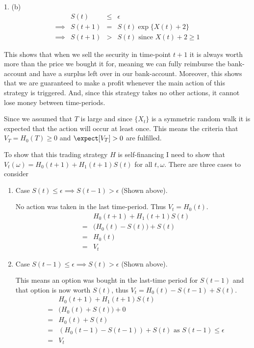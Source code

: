 \documentclass[11pt,a4paper]{article}
\begin{document}
\begin{answer}{1. (b)}
  \[\begin{array}{rrcl}
    &S(t)&\leq&\epsilon\\
    \implies&S(t+1)&=&S(t)\exp\{X(t)+2\}\\
    \implies&S(t+1)&>&S(t)\text{ since }X(t)+2\geq1
  \end{array}\]

  This shows that when we sell the security in time-point $t+1$ it is always worth more than the price we bought it for, meaning we can fully reimburse the bank-account and have a surplus left over in our bank-account. Moreover, this shows that we are guaranteed to make a profit whenever the main action of this strategy is triggered. And, since this strategy takes no other actions, it cannot lose money between time-periods.
  \par Since we assumed that $T$ is large and since $\{X_t\}$ is a symmetric random walk it is expected that the action will occur at least once. This means the criteria that $V_T=H_0(T)\geq0$ and $\expect[V_T]>0$ are fulfilled.

  \par To show that this trading strategy $H$ is self-financing I need to show that $V_t(\omega)=H_0(t+1)+H_1(t+1)S(t)$ for all $t,\omega$. There are three cases to consider
  \begin{enumerate}
    \item Case $S(t)\leq\epsilon\implies S(t-1)>\epsilon$ (Shown above).
    \par No action was taken in the last time-period. Thus $V_t=H_0(t)$.
    \[\begin{array}{rcl}
      &&H_0(t+1)+H_1(t+1)S(t)\\
      &=&\big(H_0(t)-S(t)\big)+S(t)\\
      &=&H_0(t)\\
      &=&V_t
    \end{array}\]

    \item Case $S(t-1)\leq\epsilon\implies S(t)>\epsilon$ (Shown above).
    \par This means an option was bought in the last-time period for $S(t-1)$ and that option is now worth $S(t)$, thus $V_t=H_0(t)-S(t-1)+S(t)$.
    \[\begin{array}{rcl}
      &&H_0(t+1)+H_1(t+1)S(t)\\
      &=&\big(H_0(t)+S(t)\big)+0\\
      &=&H_0(t)+S(t)\\
      &=&(H_0(t-1)-S(t-1))+S(t)\text{ as }S(t-1)\leq\epsilon\\
      &=&V_t
    \end{array}\]


\end{enumerate}
\end{answer}
\end{document}

